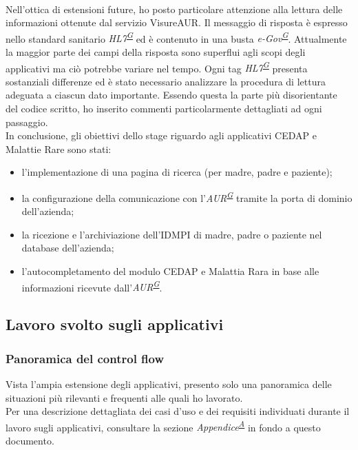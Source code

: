 \documentclass[a4paper]{article}
\begin{document}
\\
Nell'ottica di estensioni future, ho posto particolare attenzione alla lettura delle informazioni ottenute dal servizio VisureAUR. Il messaggio di risposta è espresso nello standard sanitario \textit{HL7\textsuperscript{\hyperref[sec:gl]{G}}} ed è contenuto in una busta \textit{e-Gov\textsuperscript{\hyperref[sec:gl]{G}}}. Attualmente la maggior parte dei campi della risposta sono superflui agli scopi degli applicativi ma ciò potrebbe variare nel tempo. Ogni tag \textit{HL7\textsuperscript{\hyperref[sec:gl]{G}}} presenta sostanziali differenze ed è stato necessario analizzare la procedura di lettura adeguata a ciascun dato importante. Essendo questa la parte più disorientante del codice scritto, ho inserito commenti particolarmente dettagliati ad ogni passaggio.
\\
In conclusione, gli obiettivi dello stage riguardo agli applicativi CEDAP e Malattie Rare sono stati:
\begin{itemize}
	\item l'implementazione di una pagina di ricerca (per madre, padre e paziente);
    \item la configurazione della comunicazione con l'\textit{AUR\textsuperscript{\hyperref[sec:gl]{G}}} tramite la porta di dominio dell'azienda;
    \item la ricezione e l'archiviazione dell'IDMPI di madre, padre o paziente nel database dell'azienda;
    \item l'autocompletamento del modulo CEDAP e Malattia Rara in base alle informazioni ricevute dall'\textit{AUR\textsuperscript{\hyperref[sec:gl]{G}}}.
\end{itemize}

\subsection{Lavoro svolto sugli applicativi}

\subsubsection{Panoramica del control flow}
Vista l'ampia estensione degli applicativi, presento solo una panoramica delle situazioni più rilevanti e frequenti alle quali ho lavorato.
\\
Per una descrizione dettagliata dei casi d'uso e dei requisiti individuati durante il lavoro sugli applicativi, consultare la sezione \textit{Appendice\textsuperscript{\hyperref[sec:ap]{A}}} in fondo a questo documento.
\end{document}
